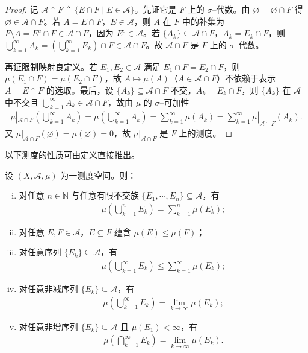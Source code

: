 \documentclass[../../main.tex]{subfiles}%
\begin{document}
\begin{proof}
记 $\mathcal{A}\cap F\triangleq\{E\cap F\mid E\in\mathcal{A}\}$。先证它是 $F$ 上的 $\sigma$--代数。由 $\varnothing =\varnothing \cap F$ 得 $\varnothing \in\mathcal{A}\cap F$。若 $A=E\cap F$，$E\in\mathcal{A}$，则 $A$ 在 $F$ 中的补集为 $F\setminus A=E^c\cap F\in\mathcal{A}\cap F$，因为 $E^c\in\mathcal{A}$。若 $\{A_k\}\subseteq\mathcal{A}\cap F$，$A_k=E_k\cap F$，则 $\bigcup_{k=1}^\infty A_k=\left(\bigcup_{k=1}^\infty E_k\right)\cap F\in\mathcal{A}\cap F$。故 $\mathcal{A}\cap F$ 是 $F$ 上的 $\sigma$--代数。

再证限制映射良定义。若 $E_1,E_2\in\mathcal{A}$ 满足 $E_1\cap F=E_2\cap F$，则 $\mu(E_1\cap F)=\mu(E_2\cap F)$，故 $A\mapsto\mu(A)$（$A\in\mathcal{A}\cap F$）不依赖于表示 $A=E\cap F$ 的选取。最后，设 $\{A_k\}\subseteq\mathcal{A}\cap F$ 不交，$A_k=E_k\cap F$，则 $\{A_k\}$ 在 $\mathcal{A}$ 中不交且 $\bigcup_{k=1}^\infty A_k\in\mathcal{A}\cap F$，故由 $\mu$ 的 $\sigma$--可加性
\begin{align*}
\mu|_{\mathcal{A}\cap F}\left(\bigcup_{k=1}^\infty A_k\right)=\mu\left(\bigcup_{k=1}^\infty A_k\right)=\sum_{k=1}^\infty\mu(A_k)=\sum_{k=1}^\infty\mu|_{\mathcal{A}\cap F}(A_k).
\end{align*}
又 $\mu|_{\mathcal{A}\cap F}(\varnothing )=\mu(\varnothing )=0$，故 $\mu|_{\mathcal{A}\cap F}$ 是 $F$ 上的测度。
\end{proof}

以下测度的性质可由定义直接推出。

\begin{proposition}\label{proposition:ch01-测度性质}
设 $(X,\mathcal{A},\mu)$ 为一测度空间。则：
\begin{enumerate}[(i)]
\item 对任意 $n\in\mathbb{N}$ 与任意有限不交族 $\{E_1,\cdots ,E_n\}\subseteq\mathcal{A}$，有
\begin{align*}
\mu\left(\bigcup_{k=1}^nE_k\right)=\sum_{k=1}^n\mu(E_k);
\end{align*}
\item 对任意 $E,F\in\mathcal{A}$，$E\subseteq F$ 蕴含 $\mu(E)\leqslant\mu(F)$；
\item 对任意序列 $\{E_k\}\subseteq\mathcal{A}$，有
\begin{align*}
\mu\left(\bigcup_{k=1}^\infty E_k\right)\leqslant\sum_{k=1}^\infty\mu(E_k);
\end{align*}
\item 对任意非减序列 $\{E_k\}\subseteq\mathcal{A}$，有
\begin{align*}
\mu\left(\bigcup_{k=1}^\infty E_k\right)=\lim_{k\to\infty}\mu(E_k);
\end{align*}
\item 对任意非增序列 $\{E_k\}\subseteq\mathcal{A}$ 且 $\mu(E_1)<\infty$，有
\begin{align*}
\mu\left(\bigcap_{k=1}^\infty E_k\right)=\lim_{k\to\infty}\mu(E_k).
\end{align*}
\end{enumerate}
\end{proposition}
\end{document}
